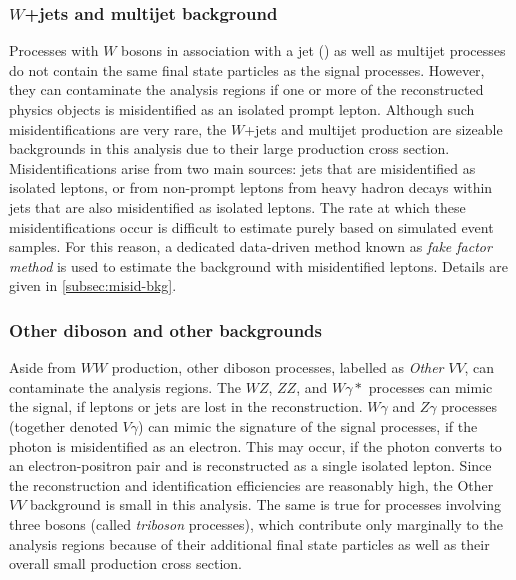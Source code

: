 \subsubsection{$W$+jets and multijet background}
Processes with $W$ bosons in association with a jet (\Wjets) as well as multijet processes do not contain the same final state particles as the signal processes. However, they can contaminate the analysis regions if one or more of the reconstructed physics objects is misidentified as an isolated prompt lepton. 
Although such misidentifications are very rare, the $W$+jets and multijet production are sizeable backgrounds in this analysis due to their large production cross section.
Misidentifications arise from two main sources: jets that are misidentified as isolated leptons, or from non-prompt leptons from heavy hadron decays within jets that are also misidentified as isolated leptons.
The rate at which these misidentifications occur is difficult to estimate purely based on simulated event samples. For this reason, a dedicated data-driven method known as \emph{fake factor method} is used to estimate the background with misidentified leptons. Details are given in \cref{subsec:misid-bkg}.


\subsubsection{Other diboson and other backgrounds}
Aside from $WW$ production, other diboson processes, labelled as \emph{Other} $VV$, can contaminate the analysis regions. 
The $WZ$, $ZZ$, and $W\gamma*$ processes can mimic the signal, if leptons or jets are lost in the reconstruction. 
$W\gamma$ and $Z\gamma$ processes (together denoted $V\gamma$) can mimic the signature of the signal processes, if the photon is misidentified as an electron. This may occur, if the photon converts to an electron-positron pair and is reconstructed as a single isolated lepton. 
Since the reconstruction and identification efficiencies are reasonably high, the Other $VV$ background is small in this analysis.
The same is true for processes involving three bosons (called \emph{triboson} processes), which contribute only marginally to the analysis regions because of their additional final state particles as well as their overall small production cross section. 


